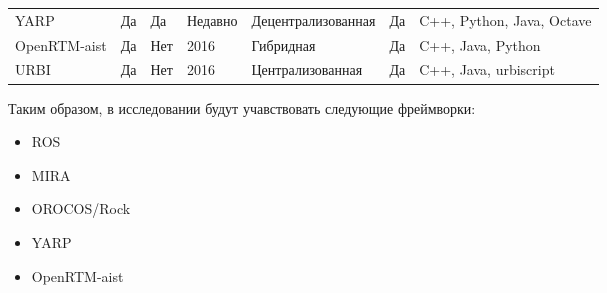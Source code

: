 \begin{table*}[h!]
\begin{tabular}{lp{2cm}p{2cm}p{2cm}lp{2.7cm}p{2cm}}
		YARP         & Да           & Да                            & Недавно             & Децентрализованная & Да                      & C++, Python, Java, Octave \\ 
		OpenRTM-aist & Да           & Нет                           & 2016                & Гибридная          & Да                      & C++, Java, Python         \\ 
		URBI         & Да           & Нет                           & 2016                & Централизованная   & Да                      & C++, Java, urbiscript     \\ 
		\bottomrule
	\end{tabular}
\end{table*}

Таким образом, в исследовании будут учавствовать следующие фреймворки:
\begin{itemize}
	\item ROS
	\item MIRA
	\item OROCOS/Rock
	\item YARP
	\item OpenRTM-aist
\end{itemize}


